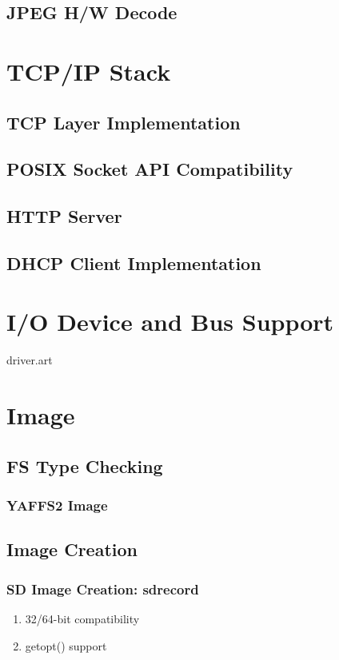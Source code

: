 \documentclass[a4paper,11pt]{book}
\begin{document}
\begin{CJK*}{UTF8}{gbsn}
\section{JPEG H/W Decode}

\chapter{TCP/IP Stack}

\section{TCP Layer Implementation}

\section{POSIX Socket API Compatibility}

\section{HTTP Server}

\section{DHCP Client Implementation}

\chapter{I/O Device and Bus Support}
 {driver.art}

\chapter{Image}

\section{FS Type Checking}

\subsection{YAFFS2 Image}

\section{Image Creation}

\subsection{SD Image Creation: sdrecord}
\begin{enumerate}
\item 32/64-bit compatibility
\item getopt() support
\end{enumerate}


\end{CJK*}
\end{document}
